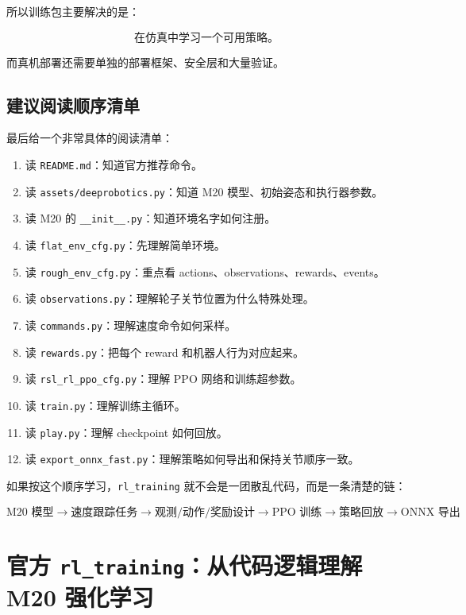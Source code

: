\documentclass[UTF8,11pt,a4paper]{ctexart}
\begin{document}
所以训练包主要解决的是：

\[
\boxed{
\text{在仿真中学习一个可用策略。}
}
\]

而真机部署还需要单独的部署框架、安全层和大量验证。

\subsection{建议阅读顺序清单}

最后给一个非常具体的阅读清单：

\begin{enumerate}
  \item 读 \texttt{README.md}：知道官方推荐命令。
  \item 读 \texttt{assets/deeprobotics.py}：知道 M20 模型、初始姿态和执行器参数。
  \item 读 M20 的 \texttt{\_\_init\_\_.py}：知道环境名字如何注册。
  \item 读 \texttt{flat\_env\_cfg.py}：先理解简单环境。
  \item 读 \texttt{rough\_env\_cfg.py}：重点看 actions、observations、rewards、events。
  \item 读 \texttt{observations.py}：理解轮子关节位置为什么特殊处理。
  \item 读 \texttt{commands.py}：理解速度命令如何采样。
  \item 读 \texttt{rewards.py}：把每个 reward 和机器人行为对应起来。
  \item 读 \texttt{rsl\_rl\_ppo\_cfg.py}：理解 PPO 网络和训练超参数。
  \item 读 \texttt{train.py}：理解训练主循环。
  \item 读 \texttt{play.py}：理解 checkpoint 如何回放。
  \item 读 \texttt{export\_onnx\_fast.py}：理解策略如何导出和保持关节顺序一致。
\end{enumerate}

如果按这个顺序学习，\texttt{rl\_training} 就不会是一团散乱代码，而是一条清楚的链：

\[
\boxed{
\text{M20 模型}
\rightarrow
\text{速度跟踪任务}
\rightarrow
\text{观测/动作/奖励设计}
\rightarrow
\text{PPO 训练}
\rightarrow
\text{策略回放}
\rightarrow
\text{ONNX 导出}
}
\]

\section{官方 \texttt{rl\_training}：从代码逻辑理解 M20 强化学习}
\end{document}
